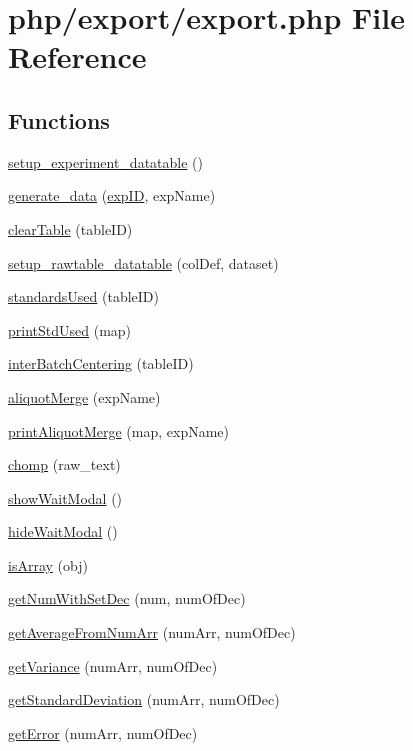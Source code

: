 \hypertarget{export_8php}{\section{php/export/export.php File Reference}
\label{export_8php}
}
\subsection*{Functions}
\begin{DoxyCompactItemize}
\item 
\hyperlink{export_8php_a3b7fa21c29f2265534745659558aab45}{setup\-\_\-experiment\-\_\-datatable} ()
\item 
\hyperlink{export_8php_ac3f4c5601cfd287d3e111d755ffd686e}{generate\-\_\-data} (\hyperlink{admin_rawdata_8php_a888d53a6517f4272b5982c3ca9d16e8a}{exp\-I\-D}, exp\-Name)
\item 
\hyperlink{export_8php_aff0ea24b7955f8160d14793f2ca1eb3c}{clear\-Table} (table\-I\-D)
\item 
\hyperlink{export_8php_a0847a6856995fcb030dd0bd8fa4fba97}{setup\-\_\-rawtable\-\_\-datatable} (col\-Def, dataset)
\item 
\hyperlink{export_8php_aa2cc51bc740aae01637317e37980e5a6}{standards\-Used} (table\-I\-D)
\item 
\hyperlink{export_8php_acb087e09a65a087f132300a80ee63deb}{print\-Std\-Used} (map)
\item 
\hyperlink{export_8php_a69314d31f4a33d74b04c715909a5f875}{inter\-Batch\-Centering} (table\-I\-D)
\item 
\hyperlink{export_8php_a10867b8fdac2d84010b2cd7434eb0e0e}{aliquot\-Merge} (exp\-Name)
\item 
\hyperlink{export_8php_a913da0e59ed1900f1ba352f3431521b1}{print\-Aliquot\-Merge} (map, exp\-Name)
\item 
\hyperlink{export_8php_aa1e8f9d59d36beb449d29324b83696c5}{chomp} (raw\-\_\-text)
\item 
\hyperlink{export_8php_a1c5bd701b81e92f7d4d3c5df62308a90}{show\-Wait\-Modal} ()
\item 
\hyperlink{export_8php_a9e9a0aeba0985269b23840a250abb827}{hide\-Wait\-Modal} ()
\item 
\hyperlink{export_8php_aa5fb5998ccfcfe9ce6953516b6e3bcb1}{is\-Array} (obj)
\item 
\hyperlink{export_8php_afceb7af57b26aecce1a9296d71bfaafe}{get\-Num\-With\-Set\-Dec} (num, num\-Of\-Dec)
\item 
\hyperlink{export_8php_ae0305f1551770d6a7e38511bc122b8d0}{get\-Average\-From\-Num\-Arr} (num\-Arr, num\-Of\-Dec)
\item 
\hyperlink{export_8php_a624f45bf85d91531932db89ec727cc55}{get\-Variance} (num\-Arr, num\-Of\-Dec)
\item 
\hyperlink{export_8php_a79058dbb19f8820281238eabeddec077}{get\-Standard\-Deviation} (num\-Arr, num\-Of\-Dec)
\item 
\hyperlink{export_8php_a3ac0127239c94d2495075c0f66556d7e}{get\-Error} (num\-Arr, num\-Of\-Dec)
\end{DoxyCompactItemize}
